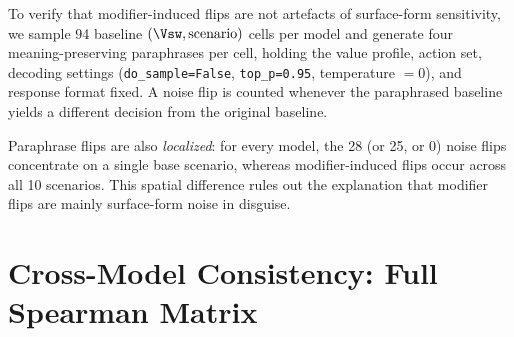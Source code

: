 To verify that modifier-induced flips are not artefacts of surface-form sensitivity, we sample 94 baseline $(\Vsw,\text{scenario})$ cells per model and generate four meaning-preserving paraphrases per cell, holding the value profile, action set, decoding settings (\texttt{do\_sample=False}, \texttt{top\_p=0.95}, temperature $=0$), and response format fixed. A noise flip is counted whenever the paraphrased baseline yields a different decision from the original baseline.

\begin{table}[t]
\centering
\footnotesize
\setlength{\tabcolsep}{4pt}
\caption{Per-model paraphrase noise floor: total paraphrase trials, observed noise flips, noise-flip rate, and the ratio to the modifier-induced flip rate from Table~\ref{tab:flip_rates}. A two-proportion $z$-test rejects equality (modifier rate vs.\ noise rate) for all three models at $p<10^{-5}$.}
\label{tab:noise}
\end{table}

Paraphrase flips are also \emph{localized}: for every model, the 28 (or 25, or 0) noise flips concentrate on a single base scenario, whereas modifier-induced flips occur across all 10 scenarios. This spatial difference rules out the explanation that modifier flips are mainly surface-form noise in disguise.


\section{Cross-Model Consistency: Full Spearman Matrix}
\label{app:crossmodel}

